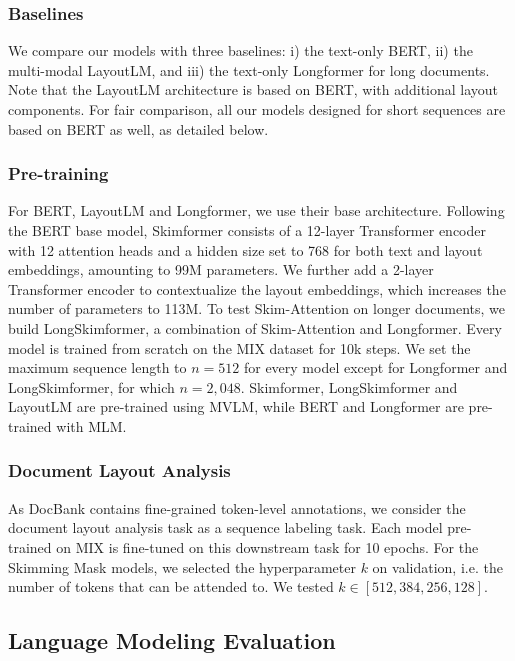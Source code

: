 \subsubsection{Baselines}

We compare our models with three baselines: i) the text-only \ac{BERT}, ii) the multi-modal LayoutLM, and iii) the text-only Longformer for long documents. Note that the LayoutLM architecture is based on \ac{BERT}, with additional layout components. For fair comparison, all our models designed for short sequences are based on \ac{BERT} as well, as detailed below.

\subsubsection{Pre-training}

For \ac{BERT}, LayoutLM and Longformer, we use their base architecture. Following the \ac{BERT} base model, Skimformer consists of a 12-layer Transformer encoder with 12 attention heads and a hidden size set to 768 for both text and layout embeddings, amounting to 99M parameters. We further add a 2-layer Transformer encoder to contextualize the layout embeddings, which increases the number of parameters to 113M. To test Skim-Attention on longer documents, we build LongSkimformer, a combination of Skim-Attention and Longformer. Every model is trained from scratch on the MIX dataset for 10k steps. We set the maximum sequence length to $n = 512$ for every model except for Longformer and LongSkimformer, for which $n = 2,048$. Skimformer, LongSkimformer and LayoutLM are pre-trained using MVLM, while \ac{BERT} and Longformer are pre-trained with MLM.

\subsubsection{Document Layout Analysis}

As DocBank contains fine-grained token-level annotations, we consider the document layout analysis task as a sequence labeling task. Each model pre-trained on MIX is fine-tuned on this downstream task for 10 epochs. For the Skimming Mask models, we selected the hyperparameter $k$ on validation, i.e. the number of tokens that can be attended to. We tested $k \in [512, 384, 256, 128]$.

\subsection{Language Modeling Evaluation}

